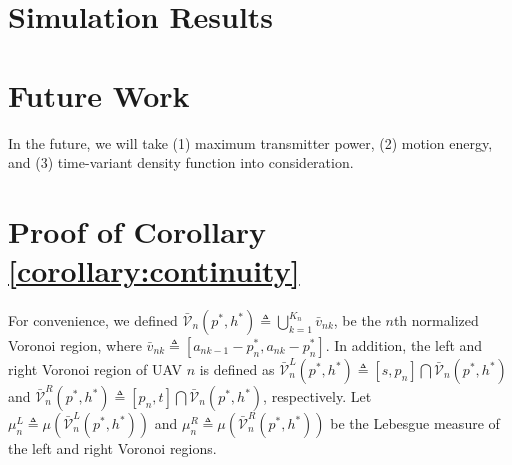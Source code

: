 \documentclass[smallabstract,smallcaptions]{dccpaper}
\newcommand{\Vor}{\ensuremath{\mathcal{V}}}         %
\newcommand{\junstart}{\color{black}}
\begin{document}
%
\section{Simulation Results}
 
\section{Future Work}
%
In the future, we will take (1) maximum transmitter power, (2) motion energy, and (3) time-variant density function
into consideration.
\appendix

\junstart \section{Proof of Corollary \ref{corollary:continuity}}\label{proof:continuity} 

For convenience, we defined $\bar{\Vor}_n(p^*,
h^*)\triangleq\bigcup_{k=1}^{K_n}\bar{v}_{nk}$, be the $n$th normalized Voronoi region, where
$\bar{v}_{nk}\triangleq[a_{nk-1}-p^*_n,a_{nk}-p^*_n]$.
In addition, the left and right Voronoi region of UAV $n$ is defined as $\bar{\Vor}^{L}_{n}(p^*, h^*) \triangleq
[s,p_n]\bigcap\bar{\Vor}_{n}(p^*, h^*)$ and $\bar{\Vor}^{R}_{n}(p^*, h^*) \triangleq [p_n, t]\bigcap\bar{\Vor}_{n}(p^*,
h^*)$, respectively.  Let $\mu^L_n\triangleq\mu\left(\bar{\Vor}^{L}_{n}(p^*, h^*)\right)$ and
$\mu^R_n\triangleq\mu\left(\bar{\Vor}^{R}_{n}(p^*, h^*)\right)$ be the Lebesgue measure of the left and right Voronoi
regions.
\end{document}

